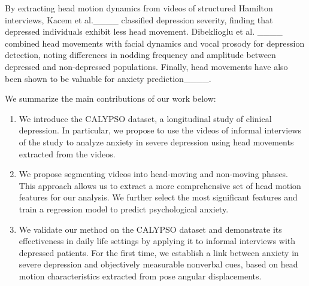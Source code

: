 By extracting head motion dynamics from videos of structured Hamilton interviews, Kacem et al.____ classified depression severity, finding that depressed individuals exhibit less head movement. Dibeklioglu et al. ____ combined head movements with facial dynamics and vocal prosody for depression detection, noting differences in nodding frequency and amplitude between depressed and non-depressed populations. Finally, head movements have also been shown to be valuable for anxiety prediction____. 
\\
\par We summarize the main contributions of our work below:
\begin{enumerate}
\item We introduce the CALYPSO dataset, a longitudinal study of clinical depression. In particular, we propose to use the videos of informal interviews of the study to analyze anxiety in severe depression using head movements extracted from the videos. %
\item We propose segmenting videos into head-moving and non-moving phases. This approach allows us to extract a more comprehensive set of head motion features for our analysis. We further select the most significant features and train a regression model to predict psychological anxiety.
\item We validate our method on the CALYPSO dataset and demonstrate its effectiveness in daily life settings by applying it to informal interviews with depressed patients. For the first time, we establish a link between anxiety in severe depression and objectively measurable nonverbal cues, based on head motion characteristics extracted from pose angular displacements.

\end{enumerate}
